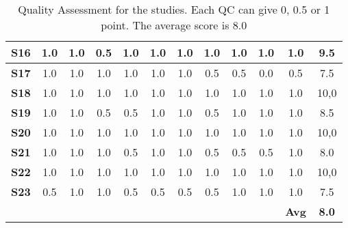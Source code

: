 \begin{table}
\begin{tabular}{|c|c|c|c|c|c|c|c|c|c|c||c|}
    \textbf{S16} & 1.0 & 1.0 & 0.5 & 1.0 & 1.0 & 1.0 & 1.0 & 1.0 & 1.0 & 1.0 & 9.5 \\ \hline
    \textbf{S17} & 1.0 & 1.0 & 1.0 & 1.0 & 1.0 & 1.0 & 0.5 & 0.5 & 0.0 & 0.5 & 7.5 \\ \hline
    \textbf{S18} & 1.0 & 1.0 & 1.0 & 1.0 & 1.0 & 1.0 & 1.0 & 1.0 & 1.0 & 1.0 & 10,0 \\ \hline
    \textbf{S19} & 1.0 & 1.0 & 0.5 & 0.5 & 1.0 & 1.0 & 0.5 & 1.0 & 1.0 & 1.0 & 8.5 \\ \hline
    \textbf{S20} & 1.0 & 1.0 & 1.0 & 1.0 & 1.0 & 1.0 & 1.0 & 1.0 & 1.0 & 1.0 & 10,0 \\ \hline
    \textbf{S21} & 1.0 & 1.0 & 1.0 & 0.5 & 1.0 & 1.0 & 0.5 & 0.5 & 0.5 & 1.0 & 8.0 \\ \hline
    \textbf{S22} & 1.0 & 1.0 & 1.0 & 1.0 & 1.0 & 1.0 & 1.0 & 1.0 & 1.0 & 1.0 & 10,0 \\ \hline
    \textbf{S23} & 0.5 & 1.0 & 1.0 & 0.5 & 0.5 & 0.5 & 0.5 & 1.0 & 1.0 & 1.0 & 7.5 \\ \hline
     &  &  &  &  &  &  &  &  &  & \textbf{Avg} & \textbf{8.0} \\ \hline
    
    \end{tabular}
    
    \caption{Quality Assessment for the studies. Each QC can give 0, 0.5 or 1 point. The average score is 8.0}
    \label{tab:quality}
\end{table}